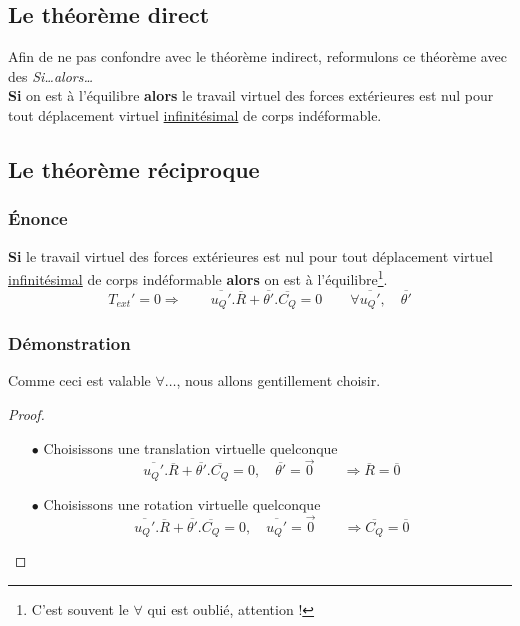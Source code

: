 	\subsection{Le théorème direct}
	Afin de ne pas confondre avec le théorème indirect, reformulons ce théorème 
	avec des \textit{Si\dots alors\dots}\\
	
	\textbf{Si} on est à l'équilibre \textbf{alors} le travail virtuel des forces 
	extérieures est nul pour tout déplacement virtuel \underline{infinitésimal} de 
	corps indéformable.\ 
	
	
	\subsection{Le théorème réciproque}
		\subsubsection{Énonce}
		\textbf{Si} le travail virtuel des forces extérieures est nul pour tout 
		déplacement virtuel \underline{infinitésimal} de corps indéformable 
		\textbf{alors} on est à l'équilibre\footnote{C'est souvent le $\forall$ 
		qui est oublié, attention !}.
		$$T_{ext}' = 0\Longrightarrow\qquad \overline{u_Q'}.\overline{R}+
		\overline{\theta'}.\overline{C_Q}=0\qquad \forall \overline{u_Q'}, 
		\quad\overline{\theta'}$$
		
		\subsubsection{Démonstration}
		Comme ceci est valable $\forall\dots$, nous allons gentillement choisir.
		\begin{proof}\ 
		\begin{itemize}
		\item[$\bullet$] Choisissons une translation virtuelle quelconque
		$$\overline{u_Q'}.\overline{R}+\overline{\theta'}.\overline{C_Q}=0,\quad 
		\overline{\theta'}=\vec0\qquad\Longrightarrow \overline{R}=\overline{0}$$
		\item[$\bullet$] Choisissons une rotation virtuelle quelconque
		$$\overline{u_Q'}.\overline{R}+\overline{\theta'}.\overline{C_Q}=0,\quad 
		\overline{u_Q'}=\vec0\qquad\Longrightarrow \overline{C_Q}=\overline{0}$$		
		\end{itemize}
		\end{proof}
		

